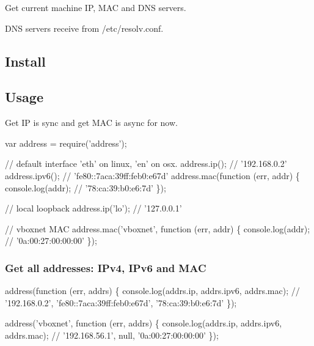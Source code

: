 \href{https://npmjs.org/package/address}{\tt } \href{https://travis-ci.org/node-modules/address}{\tt } \href{https://coveralls.io/r/node-modules/address?branch=master}{\tt } \href{https://www.gittip.com/fengmk2/}{\tt } \href{https://david-dm.org/node-modules/address}{\tt } \href{https://npmjs.org/package/address}{\tt }

Get current machine IP, M\+AC and D\+NS servers.

D\+NS servers receive from {\ttfamily /etc/resolv.conf}.

\subsection*{Install}




\subsection*{Usage}

Get IP is sync and get M\+AC is async for now.


\begin{DoxyCode}
var address = require('address');

// default interface 'eth' on linux, 'en' on osx.
address.ip();   // '192.168.0.2'
address.ipv6(); // 'fe80::7aca:39ff:feb0:e67d'
address.mac(function (err, addr) \{
  console.log(addr); // '78:ca:39:b0:e6:7d'
\});

// local loopback
address.ip('lo'); // '127.0.0.1'

// vboxnet MAC
address.mac('vboxnet', function (err, addr) \{
  console.log(addr); // '0a:00:27:00:00:00'
\});
\end{DoxyCode}


\subsubsection*{Get all addresses\+: I\+Pv4, I\+Pv6 and M\+AC}


\begin{DoxyCode}
address(function (err, addrs) \{
  console.log(addrs.ip, addrs.ipv6, addrs.mac);
  // '192.168.0.2', 'fe80::7aca:39ff:feb0:e67d', '78:ca:39:b0:e6:7d'
\});

address('vboxnet', function (err, addrs) \{
  console.log(addrs.ip, addrs.ipv6, addrs.mac);
  // '192.168.56.1', null, '0a:00:27:00:00:00'
\});
\end{DoxyCode}


